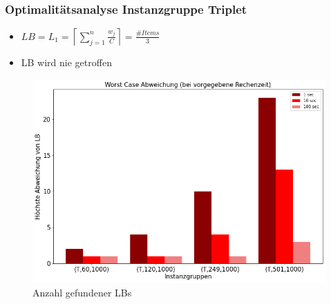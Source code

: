 \documentclass{beamer}
\begin{document}
\begin{frame}

\frametitle{Optimalitätsanalyse Instanzgruppe Triplet}
\begin{footnotesize}
\begin{itemize}
\item $LB = L_1 = \left\lceil\sum_{j=1}^{n} \frac{w_j}{C}\right\rceil = \frac{\#Items}{3} $
\item LB wird nie getroffen
\end{itemize}

\end{footnotesize}


\begin{figure}[!htbp]
\begin{center}
\includegraphics[scale=0.3]{img/wc_trip.png}
\end{center}
\caption{Anzahl gefundener LBs}
\label{fig:architecture}
\end{figure}



\end{frame}
\end{document}

